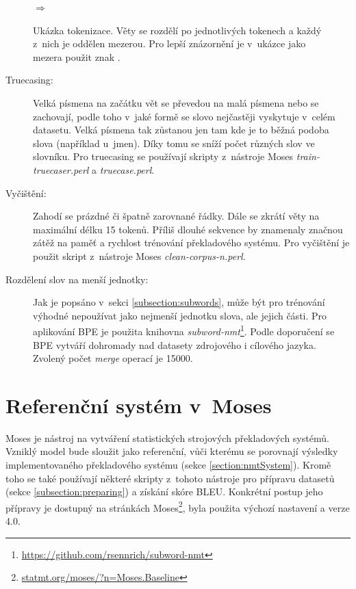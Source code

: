 \begin{figure}[H]
    \begin{center}
     \setlength{\fboxsep}{8pt}
        $\Longrightarrow$
        \setlength{\fboxsep}{8pt}
    \end{center}
	\caption{Ukázka tokenizace. Věty se rozdělí po jednotlivých tokenech a každý z~nich je oddělen mezerou. Pro lepší znázornění je v~ukázce jako mezera použit znak \uv{\textvisiblespace}.}
	\label{img:tokenization}
\end{figure}


\begin{description}
  \item[Truecasing:] Velká písmena na začátku vět se převedou na malá písmena nebo se zachovají, podle toho v~jaké formě se slovo nejčastěji vyskytuje v~celém datasetu. Velká písmena tak zůstanou jen tam kde je to běžná podoba slova (například u~jmen). Díky tomu se sníží počet různých slov ve slovníku. Pro truecasing se používají skripty z~nástroje Moses \emph{train-truecaser.perl} a \emph{truecase.perl}.
\end{description}

\begin{description}
  \item[Vyčištění:] Zahodí se prázdné či špatně zarovnané řádky. Dále se zkrátí věty na maximální délku 15 tokenů. Příliš dlouhé sekvence by znamenaly značnou zátěž na paměť a rychlost trénování překladového systému. Pro vyčištění je použit skript z~nástroje Moses \emph{clean-corpus-n.perl}.
\end{description}

\begin{description}
  \item[Rozdělení slov na menší jednotky:]\label{description:bpeApplication} Jak je popsáno v~sekci \ref{subsection:subwords}, může být pro trénování výhodné nepoužívat jako nejmenší jednotku slova, ale jejich části. Pro aplikování BPE je použita knihovna \emph{subword-nmt}\footnote{\url{https://github.com/rsennrich/subword-nmt}}. Podle doporučení se BPE vytváří dohromady nad datasety zdrojového i cílového jazyka. Zvolený počet \emph{merge} operací je 15000.
\end{description}


\section{Referenční systém v~Moses}\label{section:referent}
Moses \cite{moses} je nástroj na vytváření statistických strojových překladových systémů. Vzniklý model bude sloužit jako referenční, vůči kterému se porovnají výsledky implementovaného překladového systému (sekce \ref{section:nmtSystem}). Kromě toho se také používají některé skripty z~tohoto nástroje pro přípravu datasetů (sekce \ref{subsection:preparing}) a získání skóre BLEU. Konkrétní postup jeho přípravy je dostupný na stránkách Moses\footnote{\url{statmt.org/moses/?n=Moses.Baseline}}, byla použita výchozí nastavení a verze 4.0.

